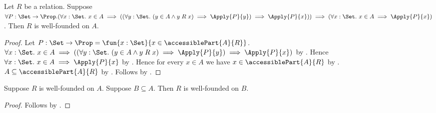 \begin{theorem}\label{well_founded_on_from_induction}
    Let $R$ be a relation.
    Suppose $\forall P:\Set\to\Prop.
        (\forall x:\Set.\ x\in A\implies
            ((\forall y:\Set.\ (y\in A\land y\mathrel{R}x)
                \implies\Apply{P}{y})\implies\Apply{P}{x}))
        \implies(\forall x:\Set.\ x\in A\implies\Apply{P}{x})$.
    Then $R$ is well-founded on $A$.
\end{theorem}
\begin{proof}
    Let $P:\Set\to\Prop=\fun{x:\Set}{x\in\accessiblePart{A}{R}}$.
    $\forall x:\Set.\ x\in A\implies
        ((\forall y:\Set.\ (y\in A\land y\mathrel{R}x)
            \implies\Apply{P}{y})\implies\Apply{P}{x})$
        by .
    Hence $\forall x:\Set.\ x\in A\implies\Apply{P}{x}$ by \auto.
    Hence for every $x\in A$ we have $x\in\accessiblePart{A}{R}$ by \auto.
    $A\subseteq\accessiblePart{A}{R}$ by .
    Follows by .
\end{proof}

\begin{proposition}\label{well_founded_on_subset_carrier}
    Suppose $R$ is well-founded on $A$.
    Suppose $B\subseteq A$.
    Then $R$ is well-founded on $B$.
\end{proposition}
\begin{proof}
    Follows by .
\end{proof}


